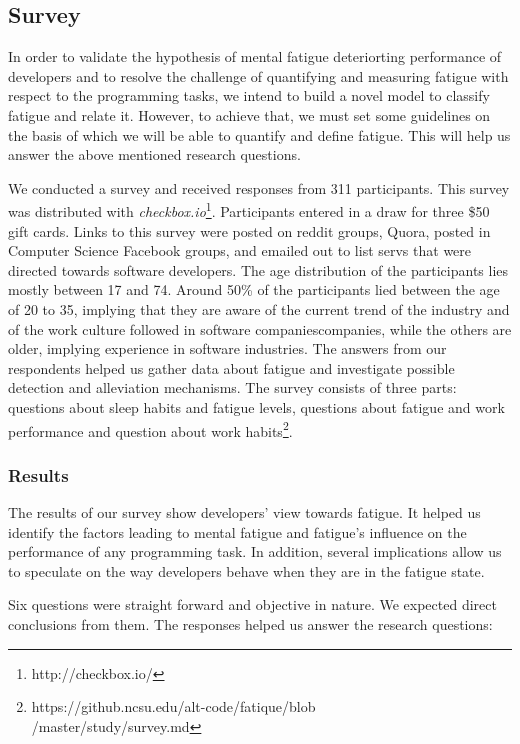\documentclass{acm_proc_article-sp}
\begin{document}
\subsection{Survey}
In order to validate the hypothesis of mental fatigue deteriorting
performance of developers and to resolve the challenge of
quantifying and measuring fatigue with respect to the programming tasks, we
intend to build a novel model to classify fatigue and relate it. However, to
achieve that, we must set some guidelines on the basis of which we will be able
to quantify and define fatigue. This will help us answer the above mentioned
research questions.

We conducted a survey and received responses from 311 participants. This survey
was distributed with \textit{checkbox.io}\footnote{http://checkbox.io/}.
Participants entered in a draw for three \$50 gift cards. Links to this
survey were posted on reddit groups, Quora, posted in Computer Science Facebook
groups, and emailed out to list servs that were directed towards software developers.
The age distribution of the participants lies mostly between 17 and 74. Around
50\% of the participants lied between the age of 20 to 35, implying that they
are aware of the current trend of the industry and of the work culture followed in
software companiescompanies, while the others are older, implying experience in
software industries. The answers from our respondents helped us gather data
about fatigue and investigate possible detection and alleviation mechanisms. The
survey consists of three parts: questions about sleep habits and fatigue levels,
questions about fatigue and work performance and question about work
habits\footnote{https://github.ncsu.edu/alt-code/fatique/blob\\/master/study/survey.md}.
  
\subsubsection{Results}
The results of our survey show developers' view towards fatigue. It helped
us identify the factors leading to mental fatigue and fatigue's influence on the
performance of any programming task. In addition, several implications allow us
to speculate on the way developers behave when they are in the fatigue state.

Six questions were straight forward and objective in nature. We expected
direct conclusions from them. The responses helped us answer the research questions:
\end{document}
